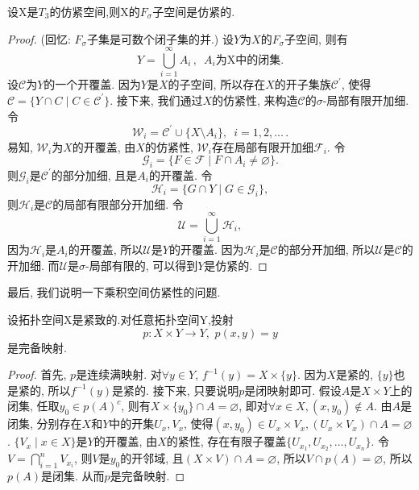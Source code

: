 \begin{thm}
  设X是$T_3$的仿紧空间,则X的$F_{\sigma}$子空间是仿紧的.
\end{thm}
\begin{proof}
  (回忆: $F_{\sigma}$子集是可数个闭子集的并.)
  设$Y$为$X$的$F_\sigma$子空间, 则有
  \[
    Y = \bigcup_{i = 1}^{\infty} A_i\,,\,\,\, A_i\text{为X中的闭集}.
  \]
  设$\mathscr{C}$为$Y$的一个开覆盖. 因为$Y$是$X$的子空间, 
  所以存在$X$的开子集族$\mathscr{C}^{'}$, 使得
  $\mathscr{C} = \{ Y \cap C \mid C \in \mathscr{C}^{'} \}$.
  接下来, 我们通过$X$的仿紧性, 来构造$\mathscr{C}$的$\sigma$-局部有限开加细.
  令
  \[
    \mathscr{W}_i = \mathscr{C}^{'} \cup \{X \setminus A_i\},
    \,\,\, i = 1, 2, \dots\,.
  \]
  易知, $\mathscr{W}_i$为$X$的开覆盖, 由$X$的仿紧性,
  $\mathscr{W}_i$存在局部有限开加细$\mathscr{F}_i$. 令
  \[
    \mathscr{G}_i = \{ F \in \mathscr{F} \mid F \cap A_i \neq \varnothing \}.
  \]
  则$\mathscr{G}_i$是$\mathscr{C}^{'}$的部分加细, 且是$A_i$的开覆盖.
  令
  \[
    \mathscr{H}_i = \{ G \cap Y \mid G \in \mathscr{G}_i \}, 
  \]
  则$\mathscr{H}_i$是$\mathscr{C}$的局部有限部分开加细. 令
  \[
    \mathscr{U} = \bigcup_{i = 1}^{\infty} \mathscr{H}_i ,
  \]
  因为$\mathscr{H}_i$是$A_i$的开覆盖, 所以$\mathscr{U}$是$Y$的开覆盖.
  因为$\mathscr{H}_i$是$\mathscr{C}$的部分开加细,
  所以$\mathscr{U}$是$\mathscr{C}$的开加细.
  而$\mathscr{U}$是$\sigma$-局部有限的, 可以得到$Y$是仿紧的.
\end{proof}

最后, 我们说明一下乘积空间仿紧性的问题.

\begin{lemma} \label{lemma:projection}
  设拓扑空间X是紧致的.对任意拓扑空间Y,投射
  \[
    p : X \times Y \longrightarrow Y,\,\, p(x, y) = y
  \]
  是完备映射.
\end{lemma}
\begin{proof}
  首先, $p$是连续满映射. 对$\forall y \in Y$,
  $f^{-1}(y) = X \times \{y\}$. 因为$X$是紧的, $\{y\}$也是紧的,
  所以$f^{-1}(y)$是紧的. 接下来, 只要说明$p$是闭映射即可.
  假设$A$是$X \times Y$上的闭集, 任取$y_0 \in p(A)^{c}$,
  则有$X \times \{ y_0 \} \cap A = \varnothing$, 
  即对$\forall x \in X, (x, y_0) \notin A$.
  由$A$是闭集, 分别存在$X$和$Y$中的开集$U_x, V_x$,
  使得$(x, y_0) \in U_x \times V_x, (U_x \times V_x) \cap A = \varnothing$.
  $\{ V_x \mid x \in X \}$是$Y$的开覆盖, 由$X$的紧性,
  存在有限子覆盖$\{ U_{x_1}, U_{x_2}, \dots, U_{x_n} \}$.
  令$V = \bigcap_{i = 1}^{n} V_{x_i}$, 则$V$是$y_0$的开邻域,
  且$(X \times V) \cap A = \varnothing$,
  所以$V \cap p(A) = \varnothing$, 所以$p(A)$是闭集.
  从而$p$是完备映射.
\end{proof}

